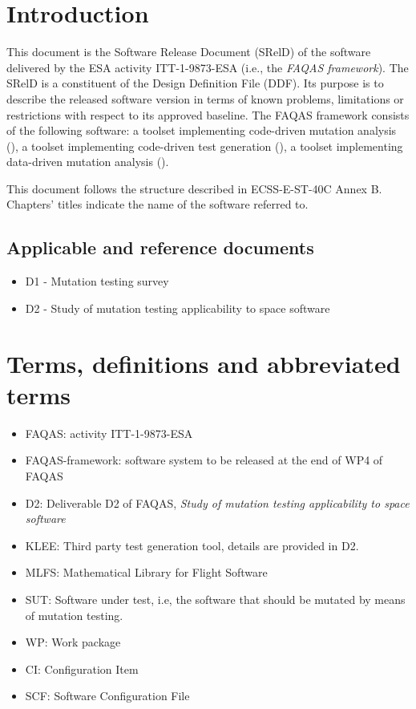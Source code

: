 
\chapter{Introduction}

This document is the Software Release Document (SRelD) of the software delivered by the ESA activity ITT-1-9873-ESA (i.e., the \emph{FAQAS framework}). The SRelD is a constituent of the Design Definition File (DDF). Its purpose is to describe the released software version in terms of known problems, limitations or restrictions with respect to its approved baseline.
The FAQAS framework consists of the following software: a toolset  implementing code-driven mutation analysis (\MASS), a toolset implementing code-driven test generation (\SEMUS), a toolset implementing data-driven mutation analysis (\DAMA).

This document follows the structure described in ECSS-E-ST-40C Annex B. Chapters' titles indicate the name of the software referred to.

\section{Applicable and reference documents}

\begin{itemize}
\item{D1 - Mutation testing survey}
\item{D2 - Study of mutation testing applicability to space software}
\end{itemize}

\chapter{Terms, definitions and abbreviated terms}

\begin{itemize}
\item{FAQAS}: activity ITT-1-9873-ESA
\item{FAQAS-framework}: software system to be released at the end of WP4 of FAQAS
\item{D2}: Deliverable D2 of FAQAS, \emph{Study of mutation testing applicability to space software}
\item{KLEE}: Third party test generation tool, details are provided in D2.
\item{MLFS}: Mathematical Library for Flight Software
\item{SUT}: Software under test, i.e, the software that should be mutated by means of mutation testing.
\item{WP}: Work package
\item{CI}: Configuration Item
\item{SCF}: Software Configuration File

\end{itemize}

\clearpage
